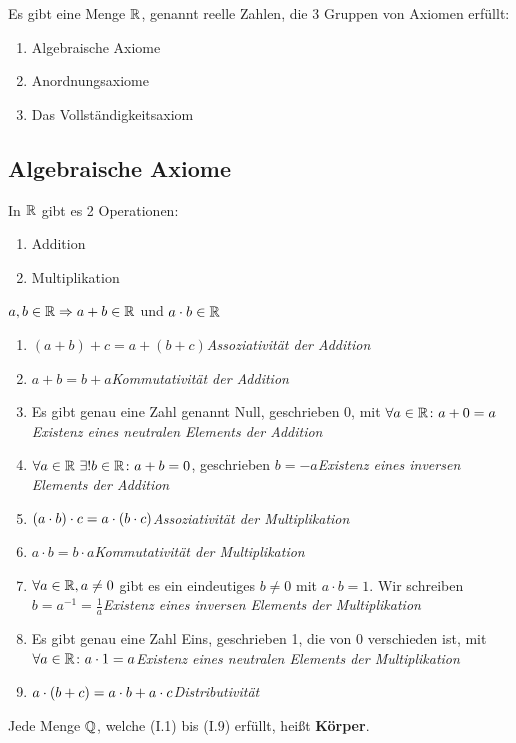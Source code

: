 \thispagestyle{pagenumberonly}

Es gibt eine Menge $\mathbb{R}$, genannt reelle Zahlen, die 3 Gruppen von Axiomen erfüllt:
\begin{enumerate}
    \item Algebraische Axiome
    \item Anordnungsaxiome
    \item Das Vollständigkeitsaxiom
\end{enumerate}

\subsection{Algebraische Axiome}
In $\mathbb{R}$ gibt es 2 Operationen:
\begin{enumerate}
    \item Addition \anf{+}
    \item Multiplikation \anf{$\cdot$}
\end{enumerate}

\begin{folgerung}
    $a,b\in\mathbb{R}\Rightarrow{} a+b\in \mathbb{R}$ und $a \cdot b\in\mathbb{R}$
\end{folgerung}

\begin{definition}
    \theoremescape
    \begin{enumerate}[label=(I.\arabic*)]
        \item $(a+b) + c = a + (b+c)$\quad \textit{Assoziativität der Addition}
        \item $a + b = b + a$\quad \textit{Kommutativität der Addition}
        \item Es gibt genau eine Zahl genannt Null, geschrieben $0$, mit $\forall a \in\mathbb{R}\colon a+0 = a$ \quad \textit{Existenz eines neutralen Elements der Addition}
        \item $\forall a\in\mathbb{R}~\exists! b\in \mathbb{R}\colon a + b = 0$, geschrieben $b=-a$\quad \textit{Existenz eines inversen Elements der Addition}
        \item $\left(a\cdot b\right)\cdot c = a\cdot\left(b\cdot c\right)$\quad \textit{Assoziativität der Multiplikation}
        \item $a\cdot b = b \cdot a$\quad \textit{Kommutativität der Multiplikation}
        \item $\forall a \in\mathbb{R}, a \neq 0$ gibt es ein eindeutiges $b\neq 0$ mit $a\cdot b = 1$. Wir schreiben $b = a^{-1} = \frac{1}{a}$\quad \textit{Existenz eines inversen Elements der Multiplikation}
        \item Es gibt genau eine Zahl Eins, geschrieben 1, die von 0 verschieden ist, mit $\forall a\in\mathbb{R}\colon a\cdot 1 = a$\quad \textit{Existenz eines neutralen Elements der Multiplikation}
        \item $a\cdot\left(b+c\right) = a \cdot b + a \cdot c$\quad \textit{Distributivität}
    \end{enumerate}

    \noindent Jede Menge $\mathbb{Q}$, welche (I.1) bis (I.9) erfüllt, heißt \textbf{Körper}.
\end{definition}

